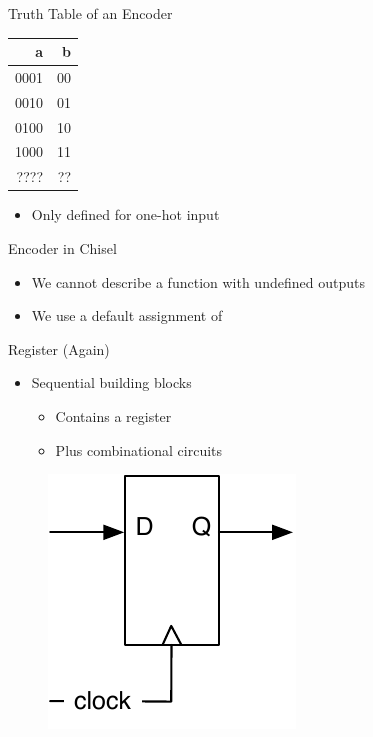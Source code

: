 \begin{frame}[fragile]{Truth Table of an Encoder}
\begin{table}
  \begin{tabular}{rr}
    \toprule
    a & b \\
    \midrule
    0001 & 00 \\
    0010 & 01 \\
    0100 & 10 \\
    1000 & 11 \\
    ???? & ?? \\
    \bottomrule 
  \end{tabular} 
\end{table}
\begin{itemize}
\item Only defined for one-hot input
\end{itemize}
\end{frame}

\begin{frame}[fragile]{Encoder in Chisel}
\begin{itemize}
\item We cannot describe a function with undefined outputs
\item We use a default assignment of 
\end{itemize}

\end{frame}

\begin{frame}[fragile]{Register (Again)}
\begin{itemize}
\item Sequential building blocks
\begin{itemize}
\item Contains a register
\item Plus combinational circuits
\end{itemize}
\end{itemize}
\begin{figure}
  \includegraphics[scale=\scale]{../figures/register}
\end{figure}
\end{frame}



